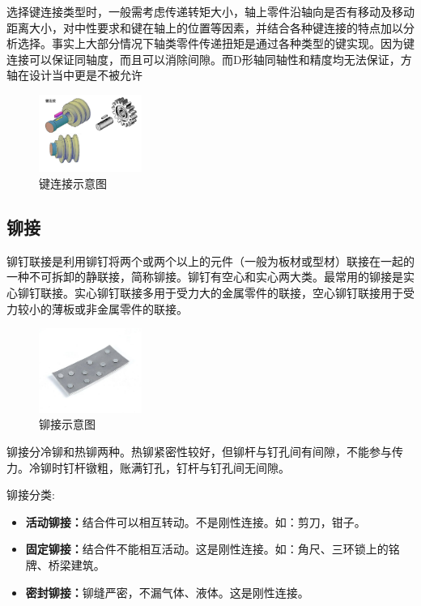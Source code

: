 \documentclass[UTF8]{article} %
\begin{document}
选择键连接类型时，一般需考虑传递转矩大小，轴上零件沿轴向是否有移动及移动距离大小，对中性要求和键在轴上的位置等因素，并结合各种键连接的特点加以分析选择。事实上大部分情况下轴类零件传递扭矩是通过各种类型的键实现。因为键连接可以保证同轴度，而且可以消除间隙。而D形轴同轴性和精度均无法保证，方轴在设计当中更是不被允许

\begin{figure}[h]
  \centering
  \includegraphics[width=0.3\textwidth]{jian1.png}
  \caption{键连接示意图}
\end{figure}


\subsection{铆接}

铆钉联接是利用铆钉将两个或两个以上的元件（一般为板材或型材）联接在一起的一种不可拆卸的静联接，简称铆接。铆钉有空心和实心两大类。最常用的铆接是实心铆钉联接。实心铆钉联接多用于受力大的金属零件的联接，空心铆钉联接用于受力较小的薄板或非金属零件的联接。

\begin{figure}[h]
  \centering
  \includegraphics[width=0.3\textwidth]{mao1.png}
  \caption{铆接示意图}
\end{figure}

铆接分冷铆和热铆两种。热铆紧密性较好，但铆杆与钉孔间有间隙，不能参与传力。冷铆时钉杆镦粗，账满钉孔，钉杆与钉孔间无间隙。

铆接分类:
\begin{itemize}
  \item  \textbf{活动铆接：}结合件可以相互转动。不是刚性连接。如：剪刀，钳子。
  \item  \textbf{固定铆接：}结合件不能相互活动。这是刚性连接。如：角尺、三环锁上的铭牌、桥梁建筑。
  \item  \textbf{密封铆接：}铆缝严密，不漏气体、液体。这是刚性连接。
\end{itemize}
\end{document}
